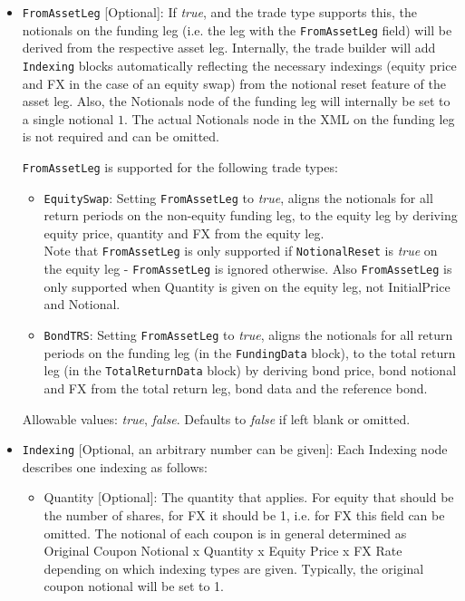 \begin{itemize}
\item \lstinline!FromAssetLeg! [Optional]: If \emph{true}, and the trade type supports this, the notionals on the funding leg (i.e. the leg with the \lstinline!FromAssetLeg! field) will be derived from the respective asset leg.  Internally, the trade builder will add \verb+Indexing+ blocks automatically reflecting the necessary indexings (equity price and FX in the  case of an equity swap) from the notional reset feature of the asset leg. Also, the Notionals node of the funding leg will internally be set to a single notional $1$.  The actual Notionals node in the XML on the funding leg is not required and can be omitted. 
  
\lstinline!FromAssetLeg! is supported for the following trade types:

\begin{itemize}
\item \lstinline!EquitySwap!: Setting \lstinline!FromAssetLeg! to \emph{true}, aligns the notionals for all return periods on the non-equity funding leg, to the equity leg by deriving equity price, quantity and FX from the equity leg. \\ Note that \lstinline!FromAssetLeg! is only supported if \lstinline!NotionalReset! is \emph{true} on the equity leg - \lstinline!FromAssetLeg! is ignored otherwise. Also \lstinline!FromAssetLeg! is only supported when Quantity is given on the equity leg, not InitialPrice and Notional.
\item \lstinline!BondTRS!: Setting \lstinline!FromAssetLeg! to \emph{true}, aligns the notionals for all return periods on the funding leg (in the \lstinline!FundingData! block), to the total return leg (in the \lstinline!TotalReturnData! block) by deriving bond price, bond notional and FX from the total return leg, bond data and the reference bond. 
\end{itemize}

  
    Allowable values: \emph{true}, \emph{false}. Defaults to \emph{false} if left blank or omitted. 
  
\item \lstinline!Indexing! [Optional, an arbitrary number can be given]: Each Indexing node describes one indexing as follows:

\begin{itemize}

\item Quantity [Optional]: The quantity that applies. For equity that should be the number of shares, for
  FX it should be 1, i.e. for FX this field can be omitted. The notional of each coupon is
  in general determined as\\
  Original Coupon Notional x Quantity x Equity Price x FX Rate\\
  depending on which indexing types are given. Typically, the original coupon notional will be set to 1.


\end{itemize}
\end{itemize}
